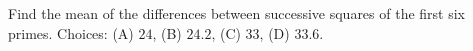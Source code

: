 Find the mean of the differences between successive squares of the first six primes. Choices: (A) $ 24 $, (B) $ 24.2 $, (C) $ 33 $, (D) $ 33.6 $.
